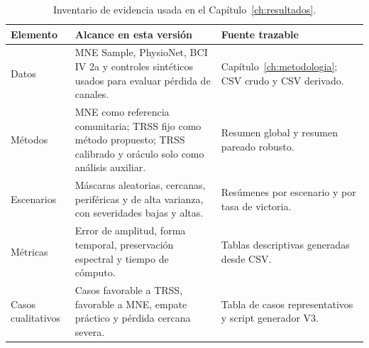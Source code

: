 \begin{table}[htbp]
\centering
\small
\caption{Inventario de evidencia usada en el Capítulo~\ref{ch:resultados}.}
\label{tab:ch4_evidence_inventory}
\begin{tabular}{@{}p{2.9cm}p{5.4cm}p{4.0cm}@{}}
\toprule
Elemento & Alcance en esta versión & Fuente trazable \\
\midrule
Datos & MNE Sample, PhysioNet, BCI IV 2a y controles sintéticos usados para evaluar pérdida de canales. & Capítulo~\ref{ch:metodologia}; CSV crudo y CSV derivado. \\
Métodos & MNE como referencia comunitaria; TRSS fijo como método propuesto; TRSS calibrado y oráculo solo como análisis auxiliar. & Resumen global y resumen pareado robusto. \\
Escenarios & Máscaras aleatorias, cercanas, periféricas y de alta varianza, con severidades bajas y altas. & Resúmenes por escenario y por tasa de victoria. \\
Métricas & Error de amplitud, forma temporal, preservación espectral y tiempo de cómputo. & Tablas descriptivas generadas desde CSV. \\
Casos cualitativos & Casos favorable a TRSS, favorable a MNE, empate práctico y pérdida cercana severa. & Tabla de casos representativos y script generador V3. \\
\bottomrule
\end{tabular}
\end{table}
